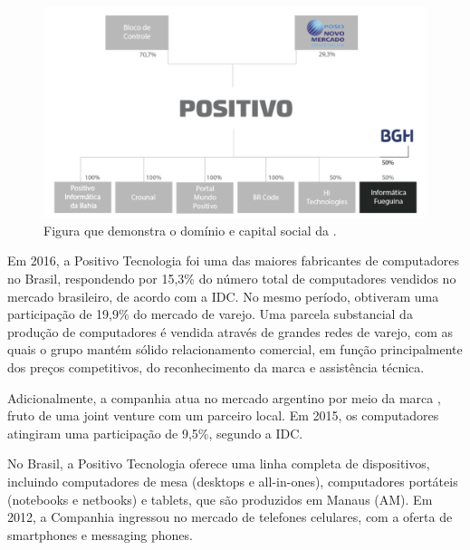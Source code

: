 \begin{figure}[h]
\begin{centering}
\includegraphics[width=1.0\textwidth]{Img/Corporativo}
\caption{Figura que demonstra o domínio e capital social da \nomeCompletoPositivo{}.}
\par\end{centering}
\end{figure}

Em 2016, a Positivo Tecnologia foi uma das maiores fabricantes de computadores no Brasil, respondendo por 15,3\% do número total de computadores vendidos no mercado brasileiro, de acordo com a IDC. No mesmo período, obtiveram uma participação de 19,9\% do mercado de varejo. Uma parcela substancial da produção de computadores é vendida através de grandes redes de varejo, com as quais o grupo mantém sólido relacionamento comercial, em função principalmente dos preços competitivos, do reconhecimento da marca e assistência técnica.

Adicionalmente, a companhia atua no mercado argentino por meio da marca \nomePositivoAr{}, fruto de uma joint venture com um parceiro local\cite{jointVentureBgh2010}. Em 2015, os computadores \nomePositivoAr{} atingiram uma participação de 9,5\%, segundo a IDC.

No Brasil, a Positivo Tecnologia oferece uma linha completa de dispositivos, incluindo computadores de mesa (desktops e all-in-ones), computadores portáteis (notebooks e netbooks) e tablets, que são produzidos em Manaus (AM). Em 2012, a Companhia ingressou no mercado de telefones celulares, com a oferta de smartphones e messaging phones.


